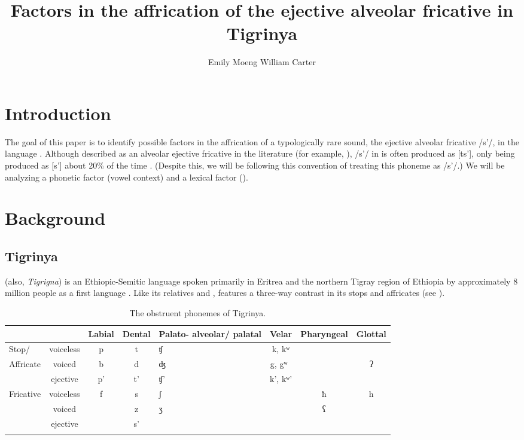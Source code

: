 \documentclass[output=paper
,newtxmath
,modfonts
,nonflat]{langsci/langscibook}
\author{Emily Moeng\affiliation{University of North Carolina, Chapel Hill} \lastand William Carter\affiliation{University of North Carolina, Chapel Hill}}
\title{Factors in the affrication of the ejective alveolar fricative in Tigrinya}
\begin{document}
\maketitle
\section{Introduction}\label{sec:moeng:1}

The goal of this paper is to identify possible factors in the affrication of a typologically rare sound, the ejective alveolar fricative /s’/, in the language . Although described as an alveolar ejective fricative in the literature (for example, \citealt{tewolde2002modern}), /s’/ in  is often produced as [ts’], only being produced as [s’] about 20\% of the time \citep{shosted2011affricating}. (Despite this, we will be following this convention of treating this phoneme as /s’/.)  We will be analyzing a phonetic factor (vowel context) and a lexical factor (). 

\section{Background}\label{sec:moeng:2}

\subsection{Tigrinya}\label{sec:moeng:2.1}

 (also, \textit{Tigrigna}) is an Ethiopic-Semitic language spoken primarily in Eritrea and the northern Tigray region of Ethiopia by approximately 8 million people as a first language \citep{lewisetal2016}. Like its relatives  and ,  features a three-way contrast in its stops and affricates (see ).

\begin{table}
\small
\begin{tabularx}{\textwidth}{lccc Q ccc}
\lsptoprule
 &  & Labial & Dental & Palato- alveolar/ palatal& Velar & Pharyngeal & Glottal\\
 \midrule
Stop/& voiceless & p & t & ʧ & k, kʷ &  & \\
Affricate & voiced & b & d & ʤ & g, gʷ~ &  & ʔ\\
 & ejective & p’ & t' & ʧ’ & k', kʷ’ &  & \\
Fricative & voiceless & f & s & ʃ &  & ħ & h\\
 & voiced &  & z & ʒ &  & ʕ & \\
 & ejective &  & s’ &  &  &  & \\
\lspbottomrule
\end{tabularx}
\caption{The obstruent phonemes of Tigrinya.}
\label{tab:moeng:1}
\end{table}
\end{document}
